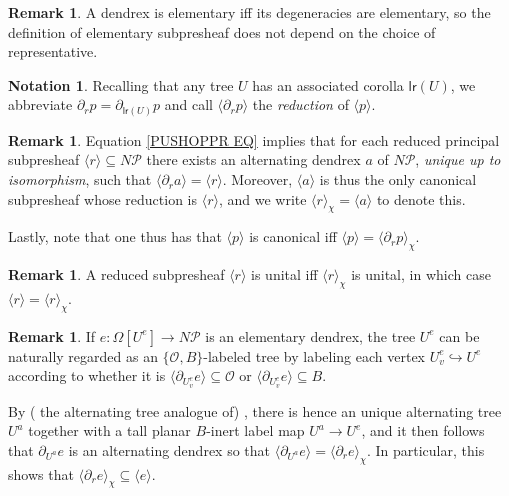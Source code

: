 \documentclass[a4paper,10pt
,draft
]{article}%
\numberwithin{equation}{section}
\numberwithin{figure}{section}
\theoremstyle{definition} %
\newtheorem{remark}[equation]{Remark}%
\newtheorem{notation}[equation]{Notation}%
\newcommand{\into}{\hookrightarrow}%
\renewcommand{\O}{\ensuremath{\mathcal O}}
\newcommand{\1}{\ensuremath{\mathbbm 1}}%
\begin{document}
\begin{remark}
	A dendrex is elementary iff its degeneracies are elementary,
	so the definition of elementary subpresheaf does not depend on the choice of representative.
\end{remark}


\begin{notation}
	Recalling that any tree $U$
	has an associated corolla $\mathsf{lr}(U)$, 
	we abbreviate
	$\partial_r p = \partial_{\mathsf{lr}(U)}p$
	and call
	$\langle \partial_r p \rangle$
	the \emph{reduction} of  
	$\langle p \rangle$.
\end{notation}




\begin{remark}\label{PUSHOPPRRST REM}
	Equation \eqref{PUSHOPPR EQ} 
	implies
	that for each reduced principal subpresheaf
	$\langle r \rangle \subseteq N \mathcal{P}$
	there exists an alternating dendrex $a$ of $N \mathcal P$, 
	\emph{unique up to isomorphism}, 
	such that
	$\langle \partial_r a \rangle = \langle r \rangle$.
	Moreover, $\langle a \rangle$ is thus the only canonical subpresheaf whose reduction is 
	$\langle r \rangle$,
	and we write
	$\langle r \rangle_{\chi} = \langle a \rangle$
	to denote this.
	
	Lastly, note that one thus has that 
	$\langle p \rangle$ is canonical iff
	$\langle p \rangle = \langle \partial_r p \rangle_{\chi}$.
\end{remark}


\begin{remark}\label{UNITALCASE REM}
	A reduced subpresheaf $\langle r \rangle$
	is unital iff 
	$\langle r \rangle_{\chi}$ is unital, in which case
	$\langle r \rangle = \langle r \rangle_{\chi}$.
\end{remark}



\begin{remark}\label{ELEMLABEL REM}
	If $e \colon \Omega[U^e] \to N \mathcal{P}$
	is an elementary dendrex, 
	the tree $U^e$ can be naturally regarded as an
	$\{\O,B\}$-labeled tree by labeling each vertex $U^e_v \into U^e$ according to whether
	it is $\langle \partial_{U^e_v} e\rangle \subseteq \O $ or
	$\langle \partial_{U^e_v} e\rangle \subseteq B$.
	
	By ({\color{blue} the alternating tree analogue of})
	\cite[Prop. 5.48]{BP_geo}, there is hence an unique alternating tree $U^a$ together with a tall planar $B$-inert label map $U^a \to U^e$,
	and it then follows that
	$\partial_{U^a} e$ is an alternating dendrex so that
	$\langle \partial_{U^a} e \rangle = \langle \partial_r e \rangle_{\chi}$.
	In particular, this shows that
	$\langle \partial_r e \rangle_{\chi} \subseteq 
	\langle e \rangle$.
\end{remark}
\end{document}
